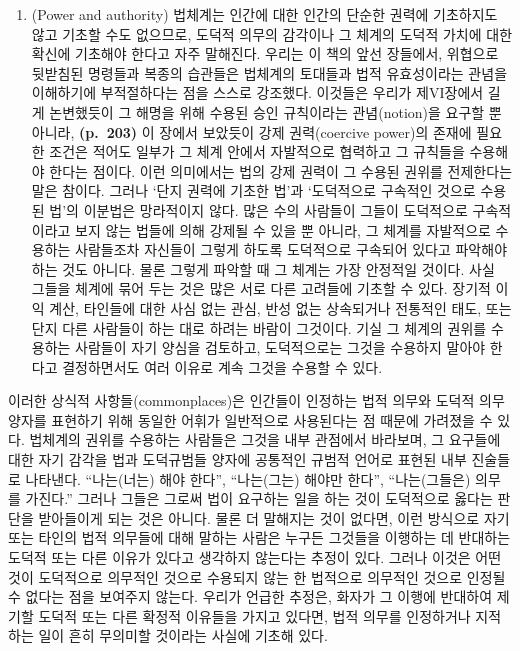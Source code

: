\begin{enumerate}
\def\labelenumi{(\roman{enumi})}
\tightlist
\item
   (Power and authority) 법체계는 인간에 대한 인간의
  단순한 권력에 기초하지도 않고 기초할 수도 없으므로, 도덕적 의무의
  감각이나 그 체계의 도덕적 가치에 대한 확신에 기초해야 한다고 자주
  말해진다. 우리는 이 책의 앞선 장들에서, 위협으로 뒷받침된 명령들과
  복종의 습관들은 법체계의 토대들과 법적 유효성이라는 관념을 이해하기에
  부적절하다는 점을 스스로 강조했다. 이것들은 우리가 제VI장에서 길게
  논변했듯이 그 해명을 위해 수용된 승인 규칙이라는 관념(notion)을 요구할
  뿐 아니라, \textbf{(p.~203)} 이 장에서 보았듯이 강제 권력(coercive
  power)의 존재에 필요한 조건은 적어도 일부가 그 체계 안에서 자발적으로
  협력하고 그 규칙들을 수용해야 한다는 점이다. 이런 의미에서는 법의 강제
  권력이 그 수용된 권위를 전제한다는 말은 참이다. 그러나 ‘단지 권력에
  기초한 법’과 ‘도덕적으로 구속적인 것으로 수용된 법’의 이분법은
  망라적이지 않다. 많은 수의 사람들이 그들이 도덕적으로 구속적이라고
  보지 않는 법들에 의해 강제될 수 있을 뿐 아니라, 그 체계를 자발적으로
  수용하는 사람들조차 자신들이 그렇게 하도록 도덕적으로 구속되어 있다고
  파악해야 하는 것도 아니다. 물론 그렇게 파악할 때 그 체계는 가장
  안정적일 것이다. 사실 그들을 체계에 묶어 두는 것은 많은 서로 다른
  고려들에 기초할 수 있다. 장기적 이익 계산, 타인들에 대한 사심 없는
  관심, 반성 없는 상속되거나 전통적인 태도, 또는 단지 다른 사람들이 하는
  대로 하려는 바람이 그것이다. 기실 그 체계의 권위를 수용하는 사람들이
  자기 양심을 검토하고, 도덕적으로는 그것을 수용하지 말아야 한다고
  결정하면서도 여러 이유로 계속 그것을 수용할 수 있다.
\end{enumerate}

이러한 상식적 사항들(commonplaces)은 인간들이 인정하는 법적 의무와
도덕적 의무 양자를 표현하기 위해 동일한 어휘가 일반적으로 사용된다는 점
때문에 가려졌을 수 있다. 법체계의 권위를 수용하는 사람들은 그것을 내부
관점에서 바라보며, 그 요구들에 대한 자기 감각을 법과 도덕규범들 양자에
공통적인 규범적 언어로 표현된 내부 진술들로 나타낸다. “나는(너는) 해야
한다”, “나는(그는) 해야만 한다”, “나는(그들은) 의무를 가진다.”
그러나 그들은 그로써 법이 요구하는 일을 하는 것이 도덕적으로 옳다는
 판단을 받아들이게 되는 것은 아니다. 물론 더 말해지는 것이
없다면, 이런 방식으로 자기 또는 타인의 법적 의무들에 대해 말하는 사람은
누구든 그것들을 이행하는 데 반대하는 도덕적 또는 다른 이유가 있다고
생각하지 않는다는 추정이 있다. 그러나 이것은 어떤 것이 도덕적으로
의무적인 것으로 수용되지 않는 한 법적으로 의무적인 것으로 인정될 수
없다는 점을 보여주지 않는다. 우리가 언급한 추정은, 화자가 그 이행에
반대하여 제기할 도덕적 또는 다른 확정적 이유들을 가지고 있다면, 법적
의무를 인정하거나 지적하는 일이 흔히 무의미할 것이라는 사실에 기초해
있다.

